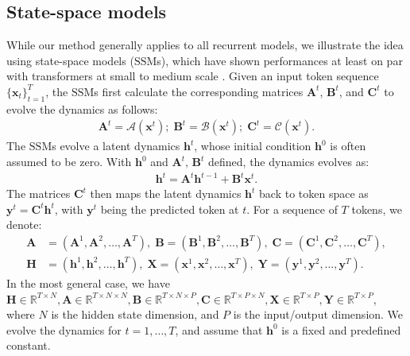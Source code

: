\documentclass{article}
\newcommand{\A}{\mathcal{A}}
\newcommand{\B}{\mathcal{B}}
\newcommand{\C}{\mathcal{C}}
\newcommand{\R}{\mathbb{R}}
\newcommand{\ssm}{\mathrm{SSM}}
\newcommand{\kb}[1]{{\color{magenta} Karim: #1 }}
\begin{document}
\subsection{State-space models}
\label{sec:ssm}
While our method generally applies to all recurrent models, we illustrate the idea using state-space models ($\ssm$s), which have shown performances at least on par with transformers at small to medium scale \citep{dao2024mamba2}. Given an input token sequence $\{\mathbf{x}_t\}_{t=1}^T$, the $\ssm$s first calculate the corresponding matrices $\mathbf{A}^t$, $\mathbf{B}^t$, and $\mathbf{C}^t$ to evolve the dynamics as follows:
\begin{align*}
    \mathbf{A}^t = \boldsymbol{\A}(\mathbf{x}^t);\; \mathbf{B}^t = \boldsymbol{\B}(\mathbf{x}^t);\; \mathbf{C}^t = \boldsymbol{\C}(\mathbf{x}^t). 
\end{align*}
The $\ssm$s evolve a latent dynamics $\mathbf{h}^t$, whose initial condition $\mathbf{h}^0$ is often assumed to be zero. With $\mathbf{h}^0$ and $\mathbf{A}^t,\,\mathbf{B}^t$ defined, the dynamics evolves as:
\begin{align*}
    \mathbf{h}^t = \mathbf{A}^t\mathbf{h}^{t-1}+\mathbf{B}^t\mathbf{x}^t.
\end{align*}
The matrices $\mathbf{C}^t$ then maps the latent dynamics $\mathbf{h}^t$ back to token space as $\mathbf{y}^t=\mathbf{C}^t \mathbf{h}^t$, with $\mathbf{y}^t$ being the predicted token at $t$. For a sequence of $T$ tokens, we denote:
\begin{align*}
    \mathbf{A} &= (\mathbf{A}^1,\mathbf{A}^2,\dots,\mathbf{A}^T),\;\mathbf{B} = (\mathbf{B}^1,\mathbf{B}^2,\dots,\mathbf{B}^T),\;\mathbf{C} = (\mathbf{C}^1,\mathbf{C}^2,\dots,\mathbf{C}^T),\\
    \mathbf{H} &= (\mathbf{h}^1,\mathbf{h}^2,\dots,\mathbf{h}^T),\;\mathbf{X} = (\mathbf{x}^1,\mathbf{x}^2,\dots,\mathbf{x}^T),\;\mathbf{Y} = (\mathbf{y}^1,\mathbf{y}^2,\dots,\mathbf{y}^T).
\end{align*}
In the most general case, we have $\mathbf{H}\in\R^{T\times N}, \mathbf{A}\in\R^{T\times N\times N}, \mathbf{B}\in\R^{T\times N\times P}, \mathbf{C}\in\R^{T\times P\times N}, \mathbf{X}\in\R^{T\times P}, \mathbf{Y}\in\R^{T\times P}$, where $N$ is the hidden state dimension, and $P$ is the input/output dimension. %
We evolve the dynamics for $t=1,\dots, T$, and assume that $\mathbf{h}^0$ is a fixed and predefined constant. 
\end{document}

